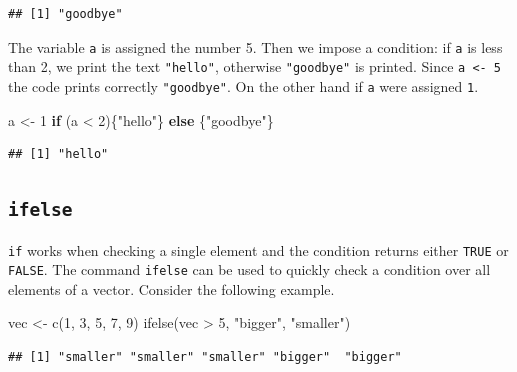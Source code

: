 \documentclass[
]{book}
\newenvironment{Shaded}{\begin{snugshade}}{\end{snugshade}}
\newcommand{\ControlFlowTok}[1]{\textcolor[rgb]{0.13,0.29,0.53}{\textbf{#1}}}
\newcommand{\DecValTok}[1]{\textcolor[rgb]{0.00,0.00,0.81}{#1}}
\newcommand{\FunctionTok}[1]{\textcolor[rgb]{0.00,0.00,0.00}{#1}}
\newcommand{\NormalTok}[1]{#1}
\newcommand{\OtherTok}[1]{\textcolor[rgb]{0.56,0.35,0.01}{#1}}
\newcommand{\SpecialCharTok}[1]{\textcolor[rgb]{0.00,0.00,0.00}{#1}}
\newcommand{\StringTok}[1]{\textcolor[rgb]{0.31,0.60,0.02}{#1}}
\begin{document}
\begin{verbatim}
## [1] "goodbye"
\end{verbatim}

The variable \texttt{a} is assigned the number 5. Then we impose a condition: if \texttt{a} is less than 2, we print the text \texttt{"hello"}, otherwise \texttt{"goodbye"} is printed. Since \texttt{a\ \textless{}-\ 5} the code prints correctly \texttt{"goodbye"}. On the other hand if \texttt{a} were assigned \texttt{1}.

\begin{Shaded}
\begin{Highlighting}[]
\NormalTok{a }\OtherTok{\textless{}{-}} \DecValTok{1}
\ControlFlowTok{if}\NormalTok{ (a }\SpecialCharTok{\textless{}} \DecValTok{2}\NormalTok{)\{}\StringTok{"hello"}\NormalTok{\} }\ControlFlowTok{else}\NormalTok{ \{}\StringTok{"goodbye"}\NormalTok{\}}
\end{Highlighting}
\end{Shaded}

\begin{verbatim}
## [1] "hello"
\end{verbatim}

\hypertarget{ifelse}{%
\subsection{\texorpdfstring{\texttt{ifelse}}{ifelse}}\label{ifelse}}

\texttt{if} works when checking a single element and the condition returns either \texttt{TRUE} or \texttt{FALSE}. The command \texttt{ifelse} can be used to quickly check a condition over all elements of a vector. Consider the following example.

\begin{Shaded}
\begin{Highlighting}[]
\NormalTok{vec }\OtherTok{\textless{}{-}} \FunctionTok{c}\NormalTok{(}\DecValTok{1}\NormalTok{, }\DecValTok{3}\NormalTok{, }\DecValTok{5}\NormalTok{, }\DecValTok{7}\NormalTok{, }\DecValTok{9}\NormalTok{)}
\FunctionTok{ifelse}\NormalTok{(vec }\SpecialCharTok{\textgreater{}} \DecValTok{5}\NormalTok{, }\StringTok{"bigger"}\NormalTok{, }\StringTok{"smaller"}\NormalTok{)}
\end{Highlighting}
\end{Shaded}

\begin{verbatim}
## [1] "smaller" "smaller" "smaller" "bigger"  "bigger"
\end{verbatim}
\end{document}
